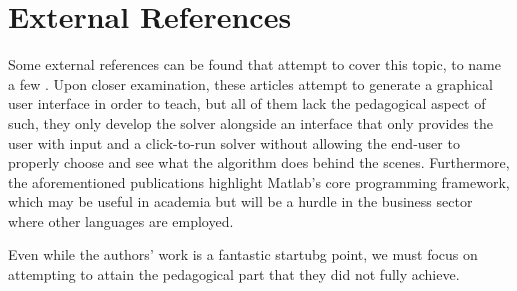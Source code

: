 \section{External References}
Some external references can be found that attempt to cover this topic, to name a few \cite{BUldingMatlabGUI} \cite{vonDohlen2020} \cite{Kosasih}. Upon closer examination, these articles attempt to generate a graphical user interface in order to teach, but all of them lack the pedagogical aspect of such, they only develop the solver alongside an interface that only provides the user with input and a click-to-run solver without allowing the end-user to properly choose and see what the algorithm does behind the scenes. Furthermore, the aforementioned publications highlight Matlab's core programming framework, which may be useful in academia but will be a hurdle in the business sector where other languages are employed.


Even while the authors' work is a fantastic startubg point, we must focus on attempting to attain the pedagogical part that they did not fully achieve.
